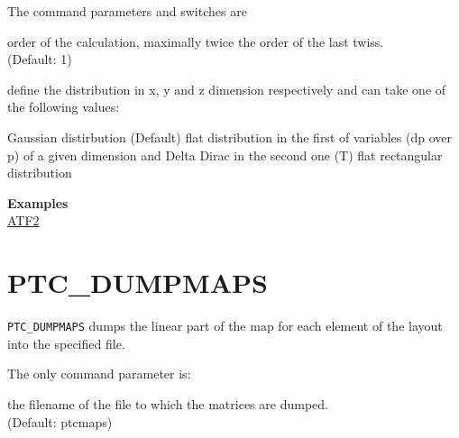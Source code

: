 

The command parameters and switches are
\begin{madlist}
    order of the calculation, maximally twice the order of the last
     twiss. \\ (Default: 1)

    define the distribution in x, y and z
   dimension respectively and can take one of the following values:
   \begin{madlist}
      Gaussian distirbution (Default)
      flat distribution in the first of
     variables (dp over p) of a given dimension and Delta Dirac in
     the second one (T)  
      flat rectangular distribution 
   \end{madlist}
\end{madlist}

{\bf Examples}\\
\href{http://cern.ch/frs/mad-X_examples/ptc_madx_interface/moments/moments.madx}{ATF2}


% 



\section{PTC\_DUMPMAPS}
\label{sec:ptc_dumpmaps}

{\tt PTC\_DUMPMAPS} dumps the linear part of the map for each element of the
layout into the specified file.  


The only command parameter is:
\begin{madlist}
   the filename of the file to which the matrices are dumped.\\   
  (Default: ptcmaps)
\end{madlist}


